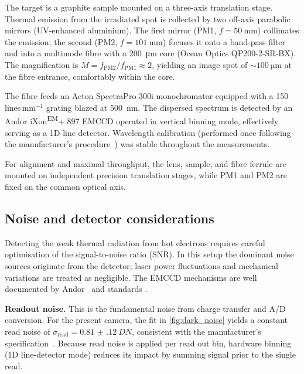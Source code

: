 \documentclass[
	a4paper,
]{scrarticle}
\begin{document}
The target is a graphite sample mounted on a three-axis translation stage. Thermal emission from the irradiated spot is collected by two off-axis parabolic mirrors (UV-enhanced aluminium). The first mirror (PM1, \(f=\SI{50}{\milli\metre}\)) collimates the emission; the second (PM2, \(f=\SI{101}{\milli\metre}\)) focuses it onto a band-pass filter and into a multimode fibre with a \SI{200}{\micro\metre} core (Ocean Optics QP200-2-SR-BX). The magnification is \(M = f_{\mathrm{PM2}}/f_{\mathrm{PM1}} \approx 2\), yielding an image spot of \(\sim\SI{100}{\micro\metre}\) at the fibre entrance, comfortably within the core.

The fibre feeds an Acton SpectraPro 300i monochromator equipped with a 150\,lines\,mm\(^{-1}\) grating blazed at \SI{500}{\nano\metre}. The dispersed spectrum is detected by an Andor iXon\textsuperscript{EM}+ 897 EMCCD operated in vertical binning mode, effectively serving as a 1D line detector.
Wavelength calibration (performed once following the manufacturer’s procedure~\cite{roobThermalRadiationUltrafast2025}) was stable throughout the measurements.

For alignment and maximal throughput, the lens, sample, and fibre ferrule are mounted on independent precision translation stages, while PM1 and PM2 are fixed on the common optical axis. 

\subsection{Noise and detector considerations}
Detecting the weak thermal radiation from hot electrons requires careful optimisation of the signal-to-noise ratio (SNR). In this setup the dominant noise sources originate from the detector; laser power fluctuations and mechanical variations are treated as negligible. The EMCCD mechanisms are well documented by Andor~\cite{dr.jowaltersSensitivityNoiseCCD2023,andorEstablishingSensitivityScientifica} and standards \cite{europeanmachinevisionassociationStandardCharacterizationImage2010}.

\textbf{Readout noise.}
This is the fundamental noise from charge transfer and A/D conversion. For the present camera, the fit in \autoref{fig:dark_noise} yields a constant read noise of
\(\sigma_{\text{read}}=\SI{0.81(12)}{DN}\), consistent with the manufacturer’s specification~\cite{andorIXonEM897Manual}.
Because read noise is applied per read out bin, hardware binning (1D line-detector mode) reduces its impact by summing signal prior to the single read.
\end{document}

